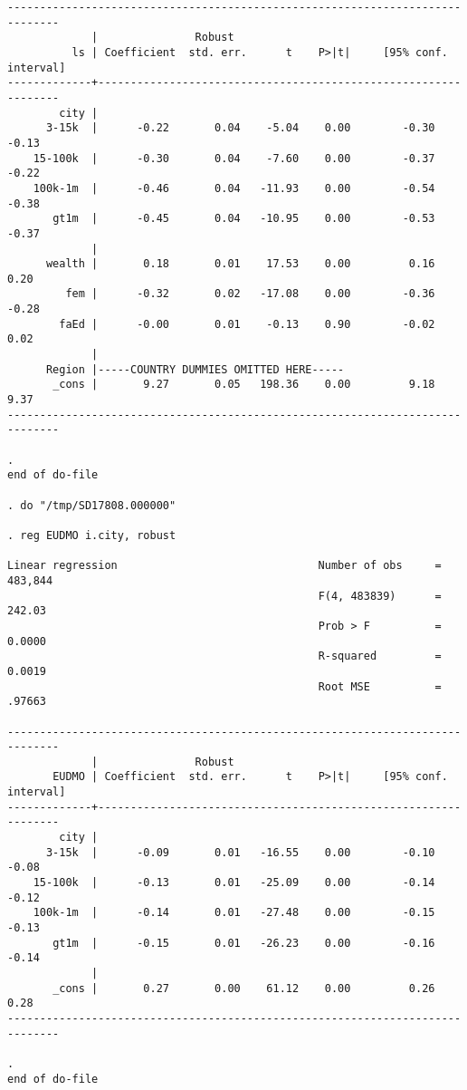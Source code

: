 \documentclass[10pt, letterpaper]{article}
\begin{document}
\begin{spacing}{1.4}
\begin{spacing}{.5}
\begin{scriptsize}
\begin{verbatim}
------------------------------------------------------------------------------
             |               Robust
          ls | Coefficient  std. err.      t    P>|t|     [95% conf. interval]
-------------+----------------------------------------------------------------
        city |
      3-15k  |      -0.22       0.04    -5.04    0.00        -0.30       -0.13
    15-100k  |      -0.30       0.04    -7.60    0.00        -0.37       -0.22
    100k-1m  |      -0.46       0.04   -11.93    0.00        -0.54       -0.38
       gt1m  |      -0.45       0.04   -10.95    0.00        -0.53       -0.37
             |
      wealth |       0.18       0.01    17.53    0.00         0.16        0.20
         fem |      -0.32       0.02   -17.08    0.00        -0.36       -0.28
        faEd |      -0.00       0.01    -0.13    0.90        -0.02        0.02
             |
      Region |-----COUNTRY DUMMIES OMITTED HERE-----
       _cons |       9.27       0.05   198.36    0.00         9.18        9.37
------------------------------------------------------------------------------

. 
end of do-file

. do "/tmp/SD17808.000000"

. reg EUDMO i.city, robust  

Linear regression                               Number of obs     =    483,844
                                                F(4, 483839)      =     242.03
                                                Prob > F          =     0.0000
                                                R-squared         =     0.0019
                                                Root MSE          =     .97663

------------------------------------------------------------------------------
             |               Robust
       EUDMO | Coefficient  std. err.      t    P>|t|     [95% conf. interval]
-------------+----------------------------------------------------------------
        city |
      3-15k  |      -0.09       0.01   -16.55    0.00        -0.10       -0.08
    15-100k  |      -0.13       0.01   -25.09    0.00        -0.14       -0.12
    100k-1m  |      -0.14       0.01   -27.48    0.00        -0.15       -0.13
       gt1m  |      -0.15       0.01   -26.23    0.00        -0.16       -0.14
             |
       _cons |       0.27       0.00    61.12    0.00         0.26        0.28
------------------------------------------------------------------------------

. 
end of do-file


\end{verbatim}
\end{scriptsize}
\end{spacing}
\end{spacing}
\end{document}
